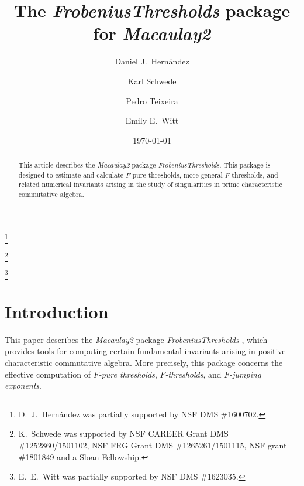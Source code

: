\documentclass{amsart}
\begin{document}
\title[]{The \emph{FrobeniusThresholds} package for \emph{Macaulay2}}

\author[]{Daniel J.\ Hern\'andez}
\address{Department of Mathematics, University of Kansas, Lawrence, KS~66045, USA}
\thanks{D.~J.~Hern\'andez was partially supported by NSF DMS \#1600702.}



\author[]{Karl Schwede}
\address{Department of Mathematics, University of Utah, Salt Lake City, UT~84112, USA}
\thanks{K.~Schwede was supported by NSF CAREER Grant DMS \#1252860/1501102, NSF FRG Grant DMS \#1265261/1501115, NSF grant \#1801849 and a Sloan Fellowship.}

\author[]{Pedro Teixeira}
\address{Department of Mathematics, Knox College, Galesburg, IL~61401, USA}

\author[]{Emily E.\ Witt}
\address{Department of Mathematics, University of Kansas, Lawrence, KS~66045, USA}
\thanks{E.~E.~Witt was partially supported by NSF DMS \#1623035.}
\date{\today}

\begin{abstract}
   This article describes the \emph{Macaulay2} package \emph{FrobeniusThresholds}.
   This package is designed to estimate and calculate $F$-pure thresholds, more general $F$-thresholds, and related numerical invariants arising in the study of singularities in prime characteristic commutative algebra.
\end{abstract}



\maketitle

\section{Introduction}

This paper describes the \emph{Macaulay2} \cite{M2} package \emph{FrobeniusThresholds} \cite{FThresholdsPackage}, which provides tools for computing certain fundamental invariants arising in positive characteristic commutative algebra.  More precisely, this package concerns the effective computation of \emph{$F$-pure thresholds}, \emph{$F$-thresholds}, and \emph{$F$-jumping exponents}.
\end{document}
